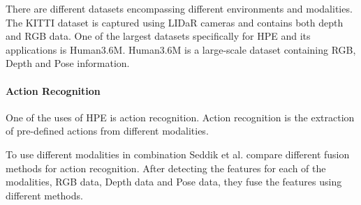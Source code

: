 There are different datasets encompassing different environments and modalities. The KITTI dataset is captured using LIDaR cameras and contains both depth and RGB data\cite{Geiger2012CVPR}. One of the largest datasets specifically for HPE and its applications is Human3.6M\cite{h36m_pami}. Human3.6M is a large-scale dataset containing RGB, Depth and Pose information.

\paragraph{Action Recognition}

One of the uses of HPE is action recognition. Action recognition is the extraction of pre-defined actions from different modalities. 

To use different modalities in combination Seddik et al. compare different fusion methods for action recognition\cite{Seddik2017}. After detecting the features for each of the modalities, RGB data, Depth data and Pose data, they fuse the features using different methods. 